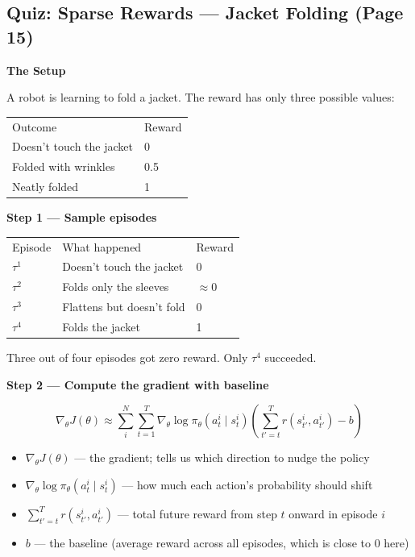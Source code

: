 \subsection{Quiz: Sparse Rewards --- Jacket Folding (Page 15)}

\textbf{The Setup}

A robot is learning to fold a jacket. The reward has only three possible values:

\begin{center}
\begin{tabular}{ll}
Outcome & Reward \\[4pt]
Doesn't touch the jacket & 0 \\
Folded with wrinkles & 0.5 \\
Neatly folded & 1 \\
\end{tabular}
\end{center}

\textbf{Step 1 --- Sample episodes}

\begin{center}
\begin{tabular}{lll}
Episode & What happened & Reward \\[4pt]
$\tau^1$ & Doesn't touch the jacket & 0 \\
$\tau^2$ & Folds only the sleeves & $\approx 0$ \\
$\tau^3$ & Flattens but doesn't fold & 0 \\
$\tau^4$ & Folds the jacket & 1 \\
\end{tabular}
\end{center}

Three out of four episodes got zero reward. Only $\tau^4$ succeeded.

\textbf{Step 2 --- Compute the gradient with baseline}

\[
\nabla_\theta J(\theta)
\approx
\sum_i^N \sum_{t=1}^T
\nabla_\theta \log \pi_\theta(a_t^i \mid s_t^i)
\left( \sum_{t'=t}^T r(s_{t'}^i, a_{t'}^i) - b \right)
\]

\begin{itemize}
  \item $\nabla_\theta J(\theta)$ --- the gradient; tells us which direction to nudge the policy
  \item $\nabla_\theta \log \pi_\theta(a_t^i \mid s_t^i)$ --- how much each action's probability
    should shift
  \item $\sum_{t'=t}^T r(s_{t'}^i, a_{t'}^i)$ --- total future reward from step $t$ onward in
    episode $i$
  \item $b$ --- the baseline (average reward across all episodes, which is close to 0 here)
\end{itemize}

